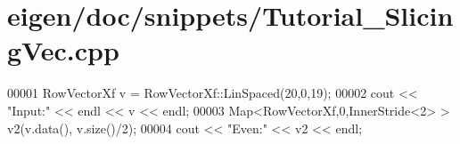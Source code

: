 \hypertarget{eigen_2doc_2snippets_2_tutorial___slicing_vec_8cpp_source}{}\section{eigen/doc/snippets/\+Tutorial\+\_\+\+Slicing\+Vec.cpp}
\label{eigen_2doc_2snippets_2_tutorial___slicing_vec_8cpp_source}

\begin{DoxyCode}
00001 RowVectorXf v = RowVectorXf::LinSpaced(20,0,19);
00002 cout << \textcolor{stringliteral}{"Input:"} << endl << v << endl;
00003 Map<RowVectorXf,0,InnerStride<2> > v2(v.data(), v.size()/2);
00004 cout << \textcolor{stringliteral}{"Even:"} << v2 << endl;
\end{DoxyCode}
